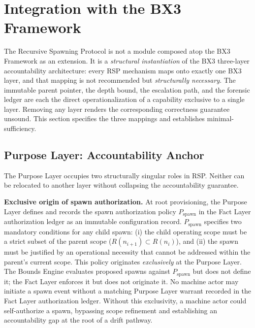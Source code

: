 \section{Integration with the BX3 Framework}
\label{sec:rs-integration}

The Recursive Spawning Protocol is not a module composed atop the BX3 Framework as an extension. It is a \textit{structural instantiation} of the BX3 three-layer accountability architecture: every RSP mechanism maps onto exactly one BX3 layer, and that mapping is not recommended but \emph{structurally necessary}. The immutable parent pointer, the depth bound, the escalation path, and the forensic ledger are each the direct operationalization of a capability exclusive to a single layer. Removing any layer renders the corresponding correctness guarantee unsound. This section specifies the three mappings and establishes minimal-sufficiency.

\subsection{Purpose Layer: Accountability Anchor}
\label{sec:rs-purpose-anchor}

The Purpose Layer occupies two structurally singular roles in RSP. Neither can be relocated to another layer without collapsing the accountability guarantee.

\medskip
\noindent\textbf{Exclusive origin of spawn authorization.} At root provisioning, the Purpose Layer defines and records the spawn authorization policy $P_{\mathrm{spawn}}$ in the Fact Layer authorization ledger as an immutable configuration record. $P_{\mathrm{spawn}}$ specifies two mandatory conditions for any child spawn: (i) the child operating scope must be a strict subset of the parent scope ($R(n_{i+1}) \subset R(n_i)$), and (ii) the spawn must be justified by an operational necessity that cannot be addressed within the parent's current scope. This policy originates \emph{exclusively} at the Purpose Layer. The Bounds Engine evaluates proposed spawns against $P_{\mathrm{spawn}}$ but does not define it; the Fact Layer enforces it but does not originate it. No machine actor may initiate a spawn event without a matching Purpose Layer warrant recorded in the Fact Layer authorization ledger. Without this exclusivity, a machine actor could self-authorize a spawn, bypassing scope refinement and establishing an accountability gap at the root of a drift pathway.

